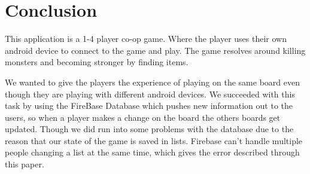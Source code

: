 \pagestyle{Uni}

\chapter{Conclusion}
This application is a 1-4 player co-op game. Where the player uses their own android device to connect to the game and play. The game resolves around killing monsters and becoming stronger by finding items.

We wanted to give the players the experience of playing on the same board even though they are playing with different android devices. We succeeded with this task by using the FireBase Database which pushes new information out to the users, so when a player makes a change on the board the others boards get updated. Though we did run into some problems with the database due to the reason that our state of the game is saved in lists. Firebase can't handle multiple people changing a list at the same time, which gives the error described through this paper.

